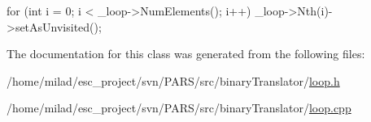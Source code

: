 \begin{DoxyCode}
                          {
        for (int i = 0; i < _loop->NumElements(); i++) {
                _loop->Nth(i)->setAsUnvisited();
        }
}
\end{DoxyCode}


The documentation for this class was generated from the following files:\begin{DoxyCompactItemize}
\item 
/home/milad/esc\_\-project/svn/PARS/src/binaryTranslator/\hyperlink{loop_8h}{loop.h}\item 
/home/milad/esc\_\-project/svn/PARS/src/binaryTranslator/\hyperlink{loop_8cpp}{loop.cpp}\end{DoxyCompactItemize}
